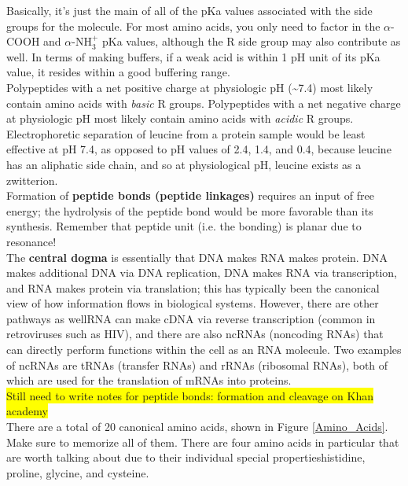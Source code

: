\documentclass{article}
\theoremstyle{plain}%
\theoremstyle{definition}
\theoremstyle{remark}
\newcommand{\hilight}[1]{\colorbox{yellow}{#1}}
\begin{document}
\noindent Basically, it's just the main of all of the pKa values associated with the side groups for the molecule. For most amino acids, you only need to factor in the $\alpha$-COOH and $\alpha$-N$\text{H}_3^+$ pKa values, although the R side group may also contribute as well. In terms of making buffers, if a weak acid is within 1 pH unit of its pKa value, it resides within a good buffering range.\\
\indent Polypeptides with a net positive charge at physiologic pH (\textasciitilde7.4) most likely contain amino acids with \textit{basic} R groups. Polypeptides with a net negative charge at physiologic pH most likely contain amino acids with \textit{acidic} R groups. \\
\indent Electrophoretic separation of leucine from a protein sample would be least effective at pH 7.4, as opposed to pH values of 2.4, 1.4, and 0.4, because leucine has an aliphatic side chain, and so at physiological pH, leucine exists as a zwitterion. \\
\indent Formation of \textbf{peptide bonds (peptide linkages)} requires an input of free energy; the hydrolysis of the peptide bond would be more favorable than its synthesis. Remember that peptide unit (i.e. the  bonding) is planar due to resonance!\\
\indent The \textbf{central dogma} is essentially that DNA makes RNA makes protein. DNA makes additional DNA via DNA replication, DNA makes RNA via transcription, and RNA makes protein via translation; this has typically been the canonical view of how information flows in biological systems. However, there are other pathways as well\textemdash RNA can make cDNA via reverse transcription (common in retroviruses such as HIV), and there are also ncRNAs (noncoding RNAs) that can directly perform functions within the cell as an RNA molecule. Two examples of ncRNAs are tRNAs (transfer RNAs) and rRNAs (ribosomal RNAs), both of which are used for the translation of mRNAs into proteins. \\
\hilight{Still need to write notes for peptide bonds: formation and cleavage on Khan academy}\\ %
\indent There are a total of 20 canonical amino acids, shown in Figure \ref{Amino_Acids}. Make sure to memorize all of them. There are four amino acids in particular that are worth talking about due to their individual special properties\textemdash histidine, proline, glycine, and cysteine.
\end{document}
